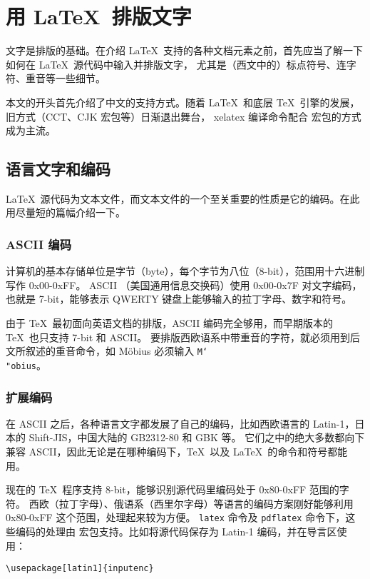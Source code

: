 \chapter{用 \LaTeX\ 排版文字}\label{chap:text}

\begin{intro}
文字是排版的基础。在介绍 \LaTeX\ 支持的各种文档元素之前，首先应当了解一下如何在 \LaTeX\ 源代码中输入并排版文字，
尤其是（西文中的）标点符号、连字符、重音等一些细节。

本文的开头首先介绍了中文的支持方式。随着 \LaTeX\ 和底层 \TeX\ 引擎的发展，旧方式（CCT、CJK 宏包等）日渐退出舞台，
xelatex 编译命令配合  宏包的方式成为主流。
\end{intro}

\section{语言文字和编码}\label{sec:encoding}

\LaTeX\ 源代码为文本文件，而文本文件的一个至关重要的性质是它的编码。在此用尽量短的篇幅介绍一下。

\subsection{ASCII 编码}\label{subsec:ascii}

计算机的基本存储单位是字节（byte），每个字节为八位（8-bit），范围用十六进制写作 0x00-0xFF。
ASCII （美国通用信息交换码）使用 0x00-0x7F 对文字编码，也就是 7-bit，能够表示 QWERTY 键盘上能够输入的拉丁字母、数字和符号。

由于 \TeX\ 最初面向英语文档的排版，ASCII 编码完全够用，而早期版本的 \TeX\ 也只支持 7-bit 和 ASCII。
要排版西欧语系中带重音的字符，就必须用到后文所叙述的重音命令，如 M\"obius 必须输入 \texttt{M\char`\\"obius}。

\subsection{扩展编码}\label{subsec:ext-encoding}

在 ASCII 之后，各种语言文字都发展了自己的编码，比如西欧语言的 Latin-1，日本的 Shift-JIS，中国大陆的 GB2312-80 和 GBK 等。
它们之中的绝大多数都向下兼容 ASCII，因此无论是在哪种编码下，\TeX\ 以及 \LaTeX\ 的命令和符号都能用。

现在的 \TeX\ 程序支持 8-bit，能够识别源代码里编码处于 0x80-0xFF 范围的字符。
西欧（拉丁字母）、俄语系（西里尔字母）等语言的编码方案刚好能够利用 0x80-0xFF 这个范围，处理起来较为方便。
\texttt{latex} 命令及 \texttt{pdflatex} 命令下，这些编码的处理由  宏包支持。比如将源代码保存为 Latin-1 编码，并在导言区使用：
\begin{verbatim}
\usepackage[latin1]{inputenc}
\end{verbatim}

